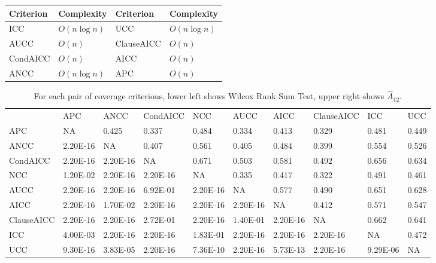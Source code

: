 \begin{table}[h]
\begin{tabular}{ll|ll}
Criterion & Complexity & Criterion  & Complexity \\ \hline
ICC       & $O(n\log n)$ & UCC        & $O(n\log n)$ \\
AUCC      & $O(n)$       & ClauseAICC & $O(n)$       \\
CondAICC  & $O(n)$       & AICC       & $O(n)$       \\
ANCC      & $O(n\log n)$ & APC        & $O(n)$      
\end{tabular}
\end{table}

\begin{table}[h]
\begin{tabular}{llllllllll}
           & APC      & ANCC     & CondAICC & NCC      & AUCC     & AICC     & ClauseAICC & ICC      & UCC   \\ 
APC        & NA       & 0.425    & 0.337    & 0.484    & 0.334    & 0.413    & 0.329      & 0.481    & 0.449 \\
ANCC       & 2.20E-16 & NA       & 0.407    & 0.561    & 0.405    & 0.484    & 0.399      & 0.554    & 0.526 \\
CondAICC   & 2.20E-16 & 2.20E-16 & NA       & 0.671    & 0.503    & 0.581    & 0.492      & 0.656    & 0.634 \\
NCC        & 1.20E-02 & 2.20E-16 & 2.20E-16 & NA       & 0.335    & 0.417    & 0.322      & 0.491    & 0.461 \\
AUCC       & 2.20E-16 & 2.20E-16 & 6.92E-01 & 2.20E-16 & NA       & 0.577    & 0.490      & 0.651    & 0.628 \\
AICC       & 2.20E-16 & 1.70E-02 & 2.20E-16 & 2.20E-16 & 2.20E-16 & NA       & 0.412      & 0.571    & 0.547 \\
ClauseAICC & 2.20E-16 & 2.20E-16 & 2.72E-01 & 2.20E-16 & 1.40E-01 & 2.20E-16 & NA         & 0.662    & 0.641 \\
ICC        & 4.00E-03 & 2.20E-16 & 2.20E-16 & 1.83E-01 & 2.20E-16 & 2.20E-16 & 2.20E-16   & NA       & 0.472 \\
UCC        & 9.30E-16 & 3.83E-05 & 2.20E-16 & 7.36E-10 & 2.20E-16 & 5.73E-13 & 2.20E-16   & 9.29E-06 & NA    \\ 
\end{tabular}
\caption{For each pair of coverage criterions, lower left shows Wilcox
Rank Sum Test, upper right shows $\hat{A}_{12}$.}
\end{table}



